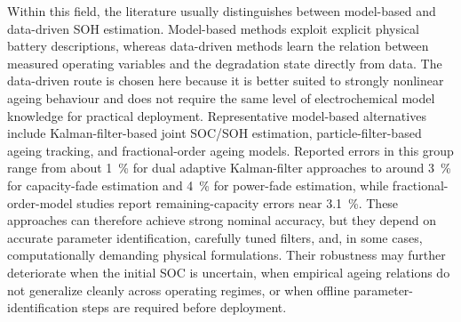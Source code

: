 \documentclass[
    a4paper,
    12pt,
    titlepage,
    bibliography=totoc,
    twoside=on,
    parskip=false,
    numbers=noenddot,
    cleardoublepage=empty,
    DIV=12,
    BCOR=12.0mm,
    headheight=36pt,
    headings=openright
]{scrreprt}
\begin{document}
Within this field, the literature usually distinguishes between model-based and data-driven SOH estimation. Model-based methods exploit explicit physical battery descriptions, whereas data-driven methods learn the relation between measured operating variables and the degradation state directly from data. The data-driven route is chosen here because it is better suited to strongly nonlinear ageing behaviour and does not require the same level of electrochemical model knowledge for practical deployment.\autocite{gouStateofHealthEstimationRemainingUsefulLife2020,ojiDataDrivenMethodsBattery2021} Representative model-based alternatives include Kalman-filter-based joint SOC/SOH estimation, particle-filter-based ageing tracking, and fractional-order ageing models. Reported errors in this group range from about \SI{1}{\percent} for dual adaptive Kalman-filter approaches to around \SI{3}{\percent} for capacity-fade estimation and \SI{4}{\percent} for power-fade estimation, while fractional-order-model studies report remaining-capacity errors near \SI{3.1}{\percent}. These approaches can therefore achieve strong nominal accuracy, but they depend on accurate parameter identification, carefully tuned filters, and, in some cases, computationally demanding physical formulations. Their robustness may further deteriorate when the initial SOC is uncertain, when empirical ageing relations do not generalize cleanly across operating regimes, or when offline parameter-identification steps are required before deployment.\autocite{liJointEstimationState2021,biOnlineStateHealth2020,tianFractionalOrderModelBasedIncremental2019}
\end{document}
